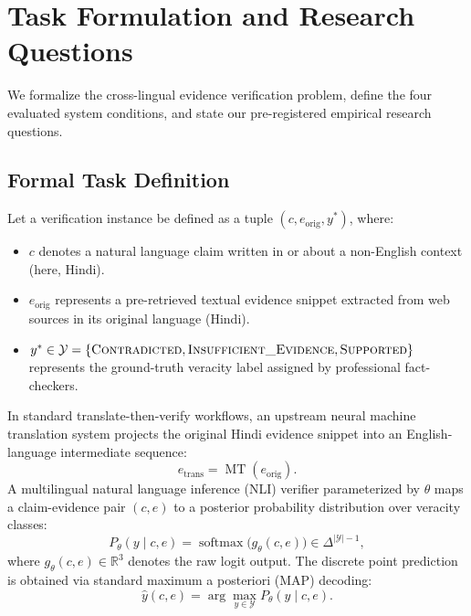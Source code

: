 \section{Task Formulation and Research Questions}
\label{sec:task_formulation}

We formalize the cross-lingual evidence verification problem, define the four evaluated system conditions, and state our pre-registered empirical research questions.

\subsection{Formal Task Definition}
Let a verification instance be defined as a tuple $(c, e_{\text{orig}}, y^*)$, where:
\begin{itemize}
    \item $c$ denotes a natural language claim written in or about a non-English context (here, Hindi).
    \item $e_{\text{orig}}$ represents a pre-retrieved textual evidence snippet extracted from web sources in its original language (Hindi).
    \item $y^* \in \mathcal{Y} = \{\textsc{Contradicted}, \textsc{Insufficient\_Evidence}, \textsc{Supported}\}$ represents the ground-truth veracity label assigned by professional fact-checkers.
\end{itemize}

In standard translate-then-verify workflows, an upstream neural machine translation system projects the original Hindi evidence snippet into an English-language intermediate sequence:
\begin{equation}
    e_{\text{trans}} = \operatorname{MT}(e_{\text{orig}}).
\end{equation}
A multilingual natural language inference (NLI) verifier parameterized by $\theta$ maps a claim-evidence pair $(c, e)$ to a posterior probability distribution over veracity classes:
\begin{equation}
    P_\theta(y \mid c, e) = \operatorname{softmax}\big(g_\theta(c, e)\big) \in \Delta^{|\mathcal{Y}|-1},
\end{equation}
where $g_\theta(c, e) \in \mathbb{R}^3$ denotes the raw logit output. The discrete point prediction is obtained via standard maximum a posteriori (MAP) decoding:
\begin{equation}
    \hat{y}(c, e) = \arg\max_{y \in \mathcal{Y}} P_\theta(y \mid c, e).
\end{equation}

